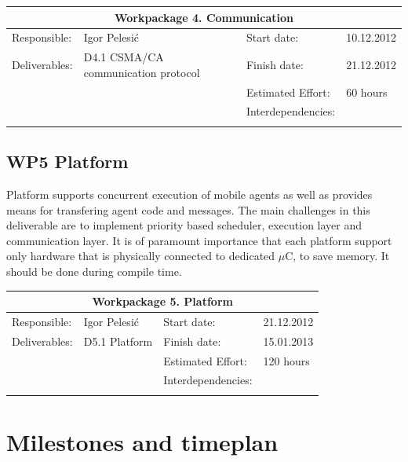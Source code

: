 \documentclass{scrreprt}
\begin{document}
\vspace{0.2in}
\begin{tabular}{|ll|ll|}
\hline \multicolumn{4}{|c|}{\textbf{Workpackage 4. Communication }}\\
\hline
Responsible:	&  Igor Pelesi\'c			& Start date:		& 10.12.2012 \\
Deliverables:	&  D4.1 CSMA/CA communication protocol	& Finish date:	 	& 21.12.2012\\
		&  					& Estimated Effort: 	& 60 hours \\
		&  					& Interdependencies:	& 	\\
		&  					& 			& 	\\
\hline
\end{tabular}


	\subsection{WP5 Platform }

Platform supports concurrent execution of mobile agents as well as provides means for transfering
agent code and messages.
The main challenges in this deliverable are to implement priority based scheduler, 
execution layer and communication layer.
It is of paramount importance that each platform support only hardware that is physically connected 
to dedicated $\mu$C, to save memory. It should be done during compile time.

\vspace{0.2in}
\begin{tabular}{|ll|ll|}
\hline \multicolumn{4}{|c|}{\textbf{Workpackage 5. Platform }}\\
\hline
Responsible:	&  Igor Pelesi\'c			& Start date:		& 21.12.2012 \\
Deliverables:	&  D5.1 Platform			& Finish date:	 	& 15.01.2013\\
		&  					& Estimated Effort: 	& 120 hours \\
		&  					& Interdependencies:	& 	\\
		&  					& 			& 	\\
\hline
\end{tabular}


	\section{Milestones and timeplan}
\end{document}
